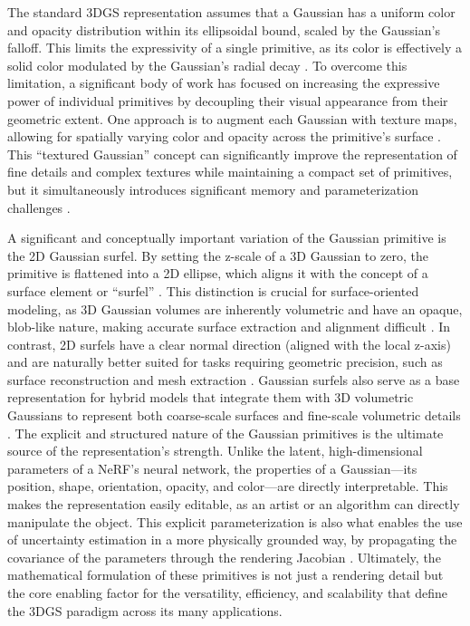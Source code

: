 \documentclass[11pt]{article}
\begin{document}
The standard 3DGS representation assumes that a Gaussian has a uniform color and opacity distribution within its ellipsoidal bound, scaled by the Gaussian's falloff. This limits the expressivity of a single primitive, as its color is effectively a solid color modulated by the Gaussian's radial decay \cite{ref17}. To overcome this limitation, a significant body of work has focused on increasing the expressive power of individual primitives by decoupling their visual appearance from their geometric extent. One approach is to augment each Gaussian with texture maps, allowing for spatially varying color and opacity across the primitive's surface \cite{ref17,ref18}. This ``textured Gaussian'' concept can significantly improve the representation of fine details and complex textures while maintaining a compact set of primitives, but it simultaneously introduces significant memory and parameterization challenges \cite{ref19,ref20}.

A significant and conceptually important variation of the Gaussian primitive is the 2D Gaussian surfel. By setting the z-scale of a 3D Gaussian to zero, the primitive is flattened into a 2D ellipse, which aligns it with the concept of a surface element or ``surfel'' \cite{ref21}. This distinction is crucial for surface-oriented modeling, as 3D Gaussian volumes are inherently volumetric and have an opaque, blob-like nature, making accurate surface extraction and alignment difficult \cite{ref22}. In contrast, 2D surfels have a clear normal direction (aligned with the local z-axis) and are naturally better suited for tasks requiring geometric precision, such as surface reconstruction and mesh extraction \cite{ref21,ref23}. Gaussian surfels also serve as a base representation for hybrid models that integrate them with 3D volumetric Gaussians to represent both coarse-scale surfaces and fine-scale volumetric details \cite{ref24}. The explicit and structured nature of the Gaussian primitives is the ultimate source of the representation's strength. Unlike the latent, high-dimensional parameters of a NeRF's neural network, the properties of a Gaussian---its position, shape, orientation, opacity, and color---are directly interpretable. This makes the representation easily editable, as an artist or an algorithm can directly manipulate the object. This explicit parameterization is also what enables the use of uncertainty estimation in a more physically grounded way, by propagating the covariance of the parameters through the rendering Jacobian \cite{ref25}. Ultimately, the mathematical formulation of these primitives is not just a rendering detail but the core enabling factor for the versatility, efficiency, and scalability that define the 3DGS paradigm across its many applications.
\end{document}
